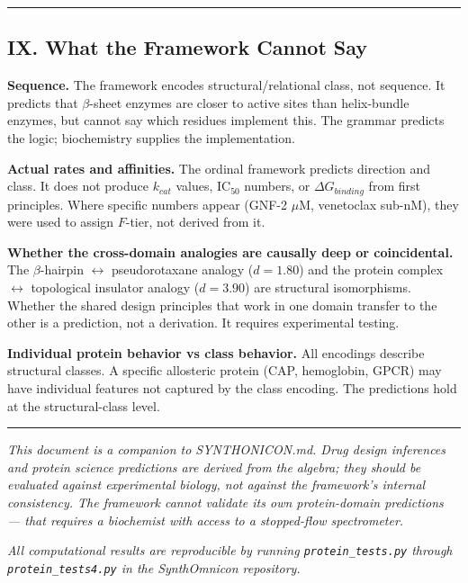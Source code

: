 \documentclass[12pt,a4paper]{article}
\begin{document}
\begin{center}
\rule{0.5\textwidth}{0.4pt}
\end{center}

\subsection{IX. What the Framework Cannot Say}

\textbf{Sequence.} The framework encodes structural/relational class, not sequence. It predicts that $\beta$-sheet enzymes are closer to active sites than helix-bundle enzymes, but cannot say which residues implement this. The grammar predicts the logic; biochemistry supplies the implementation.

\textbf{Actual rates and affinities.} The ordinal framework predicts direction and class. It does not produce $k_{cat}$ values, $\text{IC}_{50}$ numbers, or $\Delta G_{binding}$ from first principles. Where specific numbers appear (GNF-2 $\mu$M, venetoclax sub-nM), they were used to assign $F$-tier, not derived from it.

\textbf{Whether the cross-domain analogies are causally deep or coincidental.} The $\beta$-hairpin $\leftrightarrow$ pseudorotaxane analogy ($d = 1.80$) and the protein complex $\leftrightarrow$ topological insulator analogy ($d = 3.90$) are structural isomorphisms. Whether the shared design principles that work in one domain transfer to the other is a prediction, not a derivation. It requires experimental testing.

\textbf{Individual protein behavior vs class behavior.} All encodings describe structural classes. A specific allosteric protein (CAP, hemoglobin, GPCR) may have individual features not captured by the class encoding. The predictions hold at the structural-class level.

\begin{center}
\rule{0.5\textwidth}{0.4pt}
\end{center}

\emph{This document is a companion to SYNTHONICON.md. Drug design inferences and protein science predictions are derived from the algebra; they should be evaluated against experimental biology, not against the framework's internal consistency. The framework cannot validate its own protein-domain predictions --- that requires a biochemist with access to a stopped-flow spectrometer.}

\emph{All computational results are reproducible by running \texttt{protein\_tests.py} through \texttt{protein\_tests4.py} in the SynthOmnicon repository.}
\end{document}
